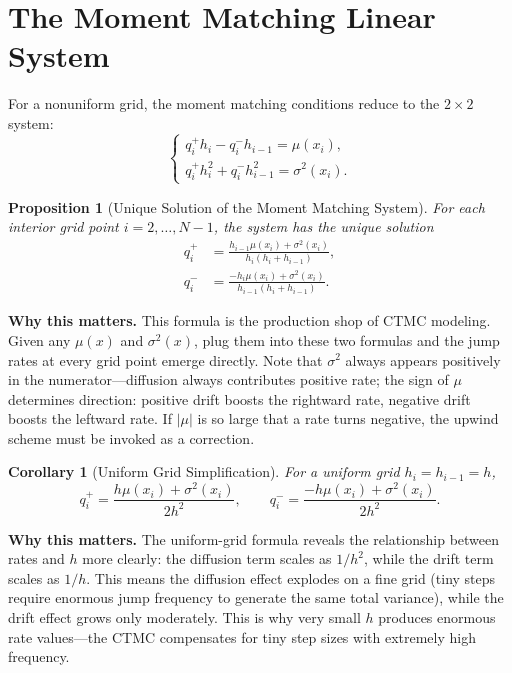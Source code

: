 \documentclass[11pt,a4paper,openany]{book}
\theoremstyle{definition}
\theoremstyle{plain}
\newtheorem{proposition}[theorem]{Proposition}
\newtheorem{corollary}[theorem]{Corollary}
\theoremstyle{remark}
\newcommand{\1}{\mathbbm{1}}
\begin{document}
\section{The Moment Matching Linear System}

For a nonuniform grid, the moment matching conditions reduce to the $2 \times 2$ system:
\[
\begin{cases}
q_{i}^{+} h_{i} - q_{i}^{-} h_{i-1} = \mu(x_{i}), \\[4pt]
q_{i}^{+} h_{i}^{2} + q_{i}^{-} h_{i-1}^{2} = \sigma^{2}(x_{i}).
\end{cases}
\]

\begin{proposition}[Unique Solution of the Moment Matching System]
For each interior grid point $i = 2, \ldots, N-1$, the system has the unique solution
\[
\boxed{\begin{aligned}
q_{i}^{+} &= \frac{h_{i-1} \mu(x_{i}) + \sigma^{2}(x_{i})}{h_{i}(h_{i} + h_{i-1})}, \\[8pt]
q_{i}^{-} &= \frac{-h_{i} \mu(x_{i}) + \sigma^{2}(x_{i})}{h_{i-1}(h_{i} + h_{i-1})}.
\end{aligned}}
\]
\end{proposition}

\medskip
\noindent\textbf{Why this matters.} This formula is the production shop of CTMC modeling. Given any $\mu(x)$ and $\sigma^2(x)$, plug them into these two formulas and the jump rates at every grid point emerge directly. Note that $\sigma^2$ always appears positively in the numerator---diffusion always contributes positive rate; the sign of $\mu$ determines direction: positive drift boosts the rightward rate, negative drift boosts the leftward rate. If $|\mu|$ is so large that a rate turns negative, the upwind scheme must be invoked as a correction.

\begin{corollary}[Uniform Grid Simplification]
For a uniform grid $h_{i} = h_{i-1} = h$,
\[
\boxed{q_{i}^{+} = \frac{h \mu(x_{i}) + \sigma^{2}(x_{i})}{2h^{2}}, \qquad
q_{i}^{-} = \frac{-h \mu(x_{i}) + \sigma^{2}(x_{i})}{2h^{2}}}.
\]
\end{corollary}

\medskip
\noindent\textbf{Why this matters.} The uniform-grid formula reveals the relationship between rates and $h$ more clearly: the diffusion term scales as $1/h^2$, while the drift term scales as $1/h$. This means the diffusion effect explodes on a fine grid (tiny steps require enormous jump frequency to generate the same total variance), while the drift effect grows only moderately. This is why very small $h$ produces enormous rate values---the CTMC compensates for tiny step sizes with extremely high frequency.
\end{document}
